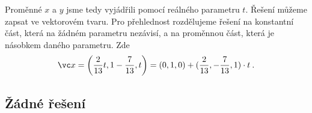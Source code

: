 \begin{example}
    Proměnné $x$ a $y$ jsme tedy vyjádřili pomocí reálného parametru $t$. Řešení můžeme zapsat ve vektorovém tvaru. Pro přehlednost rozdělujeme řešení na konstantní část, která na žádném parametru nezávisí, a na proměnnou část, která je násobkem daného parametru. Zde
    \begin{align}
        \vc x = \left( \frac{2}{13} t , 1 - \frac{7}{13}, t \right) = \left( 0, 1, 0 \right) + ( \frac{2}{13}, -\frac{7}{13} , 1 ) \cdot t \:.
    \end{align}

\end{example}

\subsection*{Žádné řešení}

